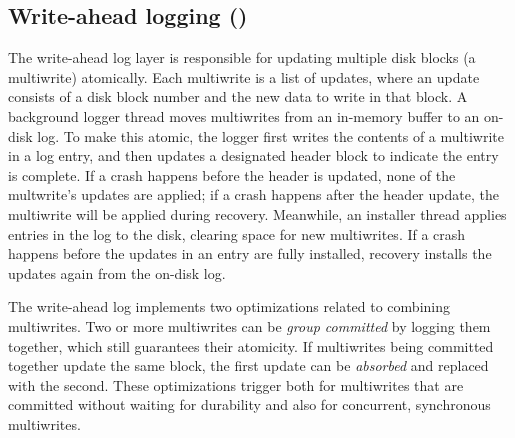 \subsection{Write-ahead logging ()}

The write-ahead log layer is responsible for updating multiple disk
blocks (a multiwrite) atomically.
Each multiwrite is a list
of updates, where an update consists of a disk block number and the new data to write in that block.
A background logger thread moves multiwrites from an in-memory buffer to an
on-disk log. To make this atomic, the logger first writes
the contents of a multiwrite in a log entry, and then updates a designated header block to indicate
the entry is complete. If a crash
happens before the header is updated, none of the multwrite's updates
are applied; if a crash happens after the header update, the multiwrite
will be applied during recovery.
Meanwhile, an installer thread applies entries in the log to the disk, clearing
space for new multiwrites.
If a crash happens before the updates in an entry are fully installed,
recovery installs the updates again from the on-disk log.

The write-ahead log implements two optimizations related to combining
multiwrites. Two or more multiwrites can be \emph{group committed} by logging
them together, which still guarantees their atomicity. If multiwrites being
committed together update the same block, the first update can be
\emph{absorbed} and replaced with the second. These optimizations trigger both
for multiwrites that are committed without waiting for durability and also for
concurrent, synchronous multiwrites.

%

